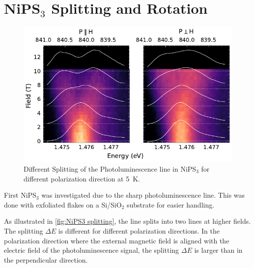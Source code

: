 \documentclass[
	oneside,
	parskip=half,
	a4paper,
]{scrbook}
\begin{document}
\section{NiPS$_3$ Splitting and Rotation}
\begin{figure}
	\centering
	\includegraphics{../figures/2024-04-10 NiPS4 splitting.pdf}
	\caption{Different Splitting of the Photoluminescence line in NiPS$_3$ for different polarization direction at \SI{5}{K}.}
	\label{fig:NiPS3 splitting}
\end{figure}
First NiPS$_3$ was investigated due to the sharp photoluminescence line.
This was done with exfoliated flakes on a Si/SiO$_2$ substrate for easier handling.

As illustrated in \autoref{fig:NiPS3 splitting}, the line splits into two lines at higher fields.\\
The splitting $\Delta E$ is different for different polarization directions.
In the polarization direction where the external magnetic field is aligned with the electric field of the photoluminescence signal, the splitting $\Delta E$ is larger than in the perpendicular direction.
\end{document}
